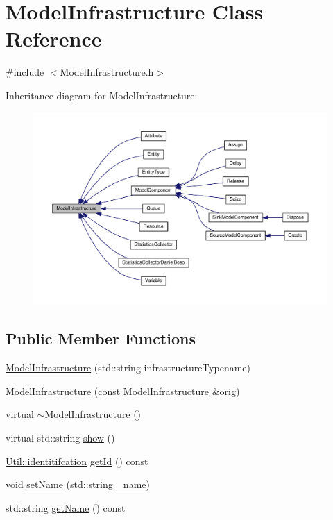 \hypertarget{class_model_infrastructure}{\section{Model\-Infrastructure Class Reference}
\label{class_model_infrastructure}
}


{\ttfamily \#include $<$Model\-Infrastructure.\-h$>$}



Inheritance diagram for Model\-Infrastructure\-:
\nopagebreak
\begin{figure}[H]
\begin{center}
\leavevmode
\includegraphics[width=350pt]{class_model_infrastructure__inherit__graph}
\end{center}
\end{figure}
\subsection*{Public Member Functions}
\begin{DoxyCompactItemize}
\item 
\hyperlink{class_model_infrastructure_aa7e7206a487b4e3ac89df8a23546a187}{Model\-Infrastructure} (std\-::string infrastructure\-Typename)
\item 
\hyperlink{class_model_infrastructure_a530efed59a4cd02b607849dc0538eddf}{Model\-Infrastructure} (const \hyperlink{class_model_infrastructure}{Model\-Infrastructure} \&orig)
\item 
virtual \hyperlink{class_model_infrastructure_aeedd4148c2b9c97600789f884c2ef549}{$\sim$\-Model\-Infrastructure} ()
\item 
virtual std\-::string \hyperlink{class_model_infrastructure_a649a5a89a0c9931783d3c51de2acf266}{show} ()
\item 
\hyperlink{class_util_ad17d458d9344b10bba64347e514d6d71}{Util\-::identitifcation} \hyperlink{class_model_infrastructure_aa4d3fa8f302cc6dc4fccdd3187e6a168}{get\-Id} () const 
\item 
void \hyperlink{class_model_infrastructure_a8ebb1f9b4475e732d31b6c8980ddccc0}{set\-Name} (std\-::string \hyperlink{class_model_infrastructure_aa73c0444ba8e3515e2aec3154eaad85d}{\-\_\-name})
\item 
std\-::string \hyperlink{class_model_infrastructure_ac06ca99d36c8d1a957697ef003e979b1}{get\-Name} () const 
\end{DoxyCompactItemize}
